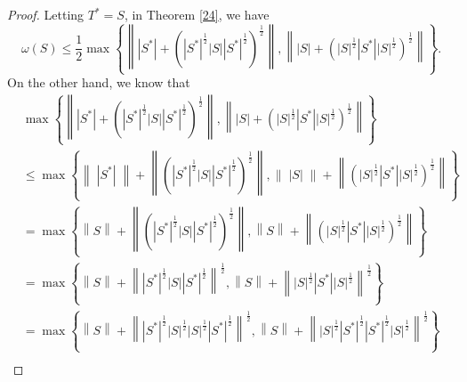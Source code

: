 \documentclass[12pt,twoside,reqno]{amsart}
\numberwithin{equation}{section}
\begin{document}
\begin{proof}
Letting ${{T}^{*}}=S$, in Theorem \ref{24}, we have
\begin{equation}\label{13}
\omega \left( S \right)\le \frac{1}{2}\max \left\{ \left\| \left| {{S}^{*}} \right|+{{\left( {{\left| {{S}^{*}} \right|}^{\frac{1}{2}}}\left| S \right|\left| {{S}^{*}} \right|^{\frac{1}{2}} \right)}^{\frac{1}{2}}} \right\|,\left\| \left| S \right|+{{\left( {{\left| S \right|}^{\frac{1}{2}}}\left| {{S}^{*}} \right|\left| S \right|^{\frac{1}{2}} \right)}^{\frac{1}{2}}} \right\| \right\}.
\end{equation}
On the other hand, we know that
\[\begin{aligned}
  & \max \left\{ \left\| \left| {{S}^{*}} \right|+{{\left( {{\left| {{S}^{*}} \right|}^{\frac{1}{2}}}\left| S \right|\left| {{S}^{*}} \right|^{\frac{1}{2}} \right)}^{\frac{1}{2}}} \right\|,\left\| \left| S \right|+{{\left( {{\left| S \right|}^{\frac{1}{2}}}\left| {{S}^{*}} \right|\left| S \right|^{\frac{1}{2}} \right)}^{\frac{1}{2}}} \right\| \right\} \\ 
 & \le \max \left\{ \left\| \;\left| {{S}^{*}} \right| \;\right\|+\left\| {{\left( {{\left| {{S}^{*}} \right|}^{\frac{1}{2}}}\left| S \right|\left| {{S}^{*}} \right| ^{\frac{1}{2}}\right)}^{\frac{1}{2}}} \right\|,\left\| \;\left| S \right| \;\right\|+\left\| {{\left( {{\left| S \right|}^{\frac{1}{2}}}\left| {{S}^{*}} \right|\left| S \right|^{\frac{1}{2}} \right)}^{\frac{1}{2}}} \right\| \right\} \\ 
 & =\max \left\{ \left\| S \right\|+\left\| {{\left( {{\left| {{S}^{*}} \right|}^{\frac{1}{2}}}\left| S \right|\left| {{S}^{*}} \right| ^{\frac{1}{2}}\right)}^{\frac{1}{2}}} \right\|,\left\| S \right\|+\left\| {{\left( {{\left| S \right|}^{\frac{1}{2}}}\left| {{S}^{*}} \right|\left| S \right| ^{\frac{1}{2}}\right)}^{\frac{1}{2}}} \right\| \right\} \\ 
 & =\max \left\{ \left\| S \right\|+{{\left\| {{\left| {{S}^{*}} \right|}^{\frac{1}{2}}}\left| S \right|\left| {{S}^{*}} \right| ^{\frac{1}{2}}\right\|}^{\frac{1}{2}}},\left\| S \right\|+{{\left\| {{\left| S \right|}^{\frac{1}{2}}}\left| {{S}^{*}} \right|\left| S \right| ^{\frac{1}{2}}\right\|}^{\frac{1}{2}}} \right\} \\ 
 & =\max \left\{ \left\| S \right\|+{{\left\| {{\left| {{S}^{*}} \right|}^{\frac{1}{2}}}{{\left| S \right|}^{\frac{1}{2}}}{{\left| S \right|}^{\frac{1}{2}}}\left| {{S}^{*}} \right| ^{\frac{1}{2}}\right\|}^{\frac{1}{2}}},\left\| S \right\|+{{\left\| {{\left| S \right|}^{\frac{1}{2}}}{{\left| {{S}^{*}} \right|}^{\frac{1}{2}}}{{\left| {{S}^{*}} \right|}^{\frac{1}{2}}}\left| S \right|^{\frac{1}{2}} \right\|}^{\frac{1}{2}}} \right\} \\ 

\end{aligned}\]
\end{proof}
\end{document}
